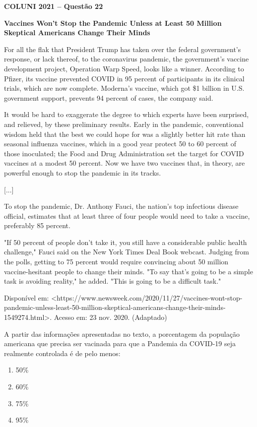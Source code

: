 \textbf{COLUNI 2021 -- Questão 22}\par\medskip \textbf{Vaccines Won't Stop the Pandemic Unless at Least 50 Million Skeptical Americans Change Their Minds}

For all the flak that President Trump has taken over the federal government's response, or lack thereof, to the coronavirus pandemic, the government's vaccine development project, Operation Warp Speed, looks like a winner. According to Pfizer, its vaccine prevented COVID in 95 percent of participants in its clinical trials, which are now complete. Moderna's vaccine, which got \$1 billion in U.S. government support, prevents 94 percent of cases, the company said.

It would be hard to exaggerate the degree to which experts have been surprised, and relieved, by these preliminary results. Early in the pandemic, conventional wisdom held that the best we could hope for was a slightly better hit rate than seasonal influenza vaccines, which in a good year protect 50 to 60 percent of those inoculated; the Food and Drug Administration set the target for COVID vaccines at a modest 50 percent. Now we have two vaccines that, in theory, are powerful enough to stop the pandemic in its tracks.

[...]

To stop the pandemic, Dr. Anthony Fauci, the nation's top infectious disease official, estimates that at least three of four people would need to take a vaccine, preferably 85 percent.

"If 50 percent of people don't take it, you still have a considerable public health challenge," Fauci said on the New York Times Deal Book webcast. Judging from the polls, getting to 75 percent would require convincing about 50 million vaccine-hesitant people to change their minds. "To say that's going to be a simple task is avoiding reality," he added. "This is going to be a difficult task."

Disponível em: <https://www.newsweek.com/2020/11/27/vaccines-wont-stop-pandemic-unless-least-50-million-skeptical-americans-change-their-minds-1549274.html>. Acesso em: 23 nov. 2020. (Adaptado)

\par

A partir das informações apresentadas no texto, a porcentagem da população americana que precisa ser vacinada para que a Pandemia da COVID-19 seja realmente controlada é de pelo menos:\begin{enumerate}
\item 50\%
\item 60\%
\item 75\%
\item 95\%
\end{enumerate}
